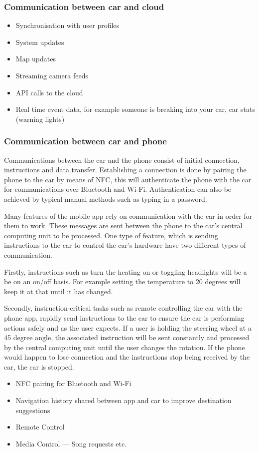 \documentclass{article}
\begin{document}
\subsubsection{Communication between car and cloud}
        \begin{itemize}
          \item Synchronisation with user profiles
          \item System updates
          \item Map updates
          \item Streaming camera feeds
          \item API calls to the cloud
          \item Real time event data, for example someone is breaking into your car, car stats (warning lights)
        \end{itemize}
\subsubsection{Communication between car and phone}
Communications between the car and the phone consist of initial connection, instructions and data transfer. Establishing a connection is done by pairing the phone to the car by means of NFC, this will authenticate the phone with the car for communications over Bluetooth and Wi-Fi. Authentication can also be achieved by typical manual methods such as typing in a password. 

Many features of the mobile app rely on communication with the car in order for them to work. These messages are sent between the phone to the car's central computing unit to be processed. One type of feature, which is sending instructions to the car to control the car's hardware have two different types of communication. 

Firstly, instructions such as turn the heating on or toggling headlights will be a be on an on/off basis. For example setting the temperature to 20 degrees will keep it at that until it has changed.

Secondly, instruction-critical tasks such as remote controlling the car with the phone app, rapidly send instructions to the car to ensure the car is performing actions safely and as the user expects. If a user is holding the steering wheel at a 45 degree angle, the associated instruction will be sent constantly and processed by the central computing unit until the user changes the rotation. If the phone would happen to lose connection and the instructions stop being received by the car, the car is stopped.
      \begin{itemize}
        	\item NFC pairing for Bluetooth and Wi-Fi
            \item Navigation history shared between app and car to improve destination suggestions
            \item Remote Control
            \item Media Control --- Song requests etc.
	  \end{itemize}
\end{document}
